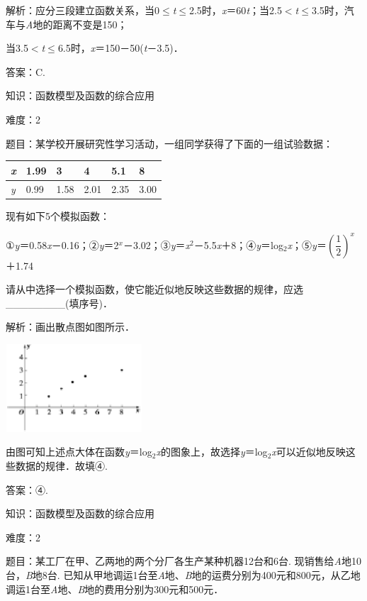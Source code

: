 \documentclass{article} %
\begin{document}
解析：应分三段建立函数关系，当0$\mathrm{\le}$\textit{t}$\mathrm{\le}$2.5时，\textit{x}＝60\textit{t}；当2.5$\mathrm{<}$\textit{t}$\mathrm{\le}$3.5时，汽车与\textit{A}地的距离不变是150；

当3.5$\mathrm{<}$\textit{t}$\mathrm{\le}$6.5时，\textit{x}＝150－50(\textit{t}－3.5)．

答案：C.

知识：函数模型及函数的综合应用

难度：2

题目：某学校开展研究性学习活动，一组同学获得了下面的一组试验数据：

\textit{}

\begin{tabular}{|p{0.2in}|p{0.4in}|p{0.4in}|p{0.4in}|p{0.4in}|p{0.4in}|} \hline
	\textit{x} & 1.99\textit{} & 3\textit{} & 4\textit{} & 5.1\textit{} & 8 \\ \hline
	\textit{y} & 0.99\textit{} & 1.58\textit{} & 2.01\textit{} & 2.35\textit{} & 3.00 \\ \hline
\end{tabular}

现有如下5个模拟函数：

①\textit{y}＝0.58\textit{x}－0.16；②\textit{y}＝2\textit{${}^{x}$}－3.02；③\textit{y}＝\textit{x}${}^{2}$－5.5\textit{x}＋8；④\textit{y}＝log${}_{2}$\textit{x}；⑤\textit{y}＝$(\dfrac{1}{2})^{x}$＋1.74

请从中选择一个模拟函数，使它能近似地反映这些数据的规律，应选\_\_\_\_\_\_\_\_(填序号)．

解析：画出散点图如图所示．

\includegraphics*[width=2.01in, height=1.29in, keepaspectratio=false]{image83}

由图可知上述点大体在函数\textit{y}＝log${}_{2}$\textit{x}的图象上，故选择\textit{y}＝log${}_{2}$\textit{x}可以近似地反映这些数据的规律．故填④.

答案：④.

知识：函数模型及函数的综合应用

难度：2

题目：某工厂在甲、乙两地的两个分厂各生产某种机器12台和6台. 现销售给\textit{A}地10台，\textit{B}地8台. 已知从甲地调运1台至\textit{A}地、\textit{B}地的运费分别为400元和800元，从乙地调运1台至\textit{A}地、\textit{B}地的费用分别为300元和500元．
\end{document}
